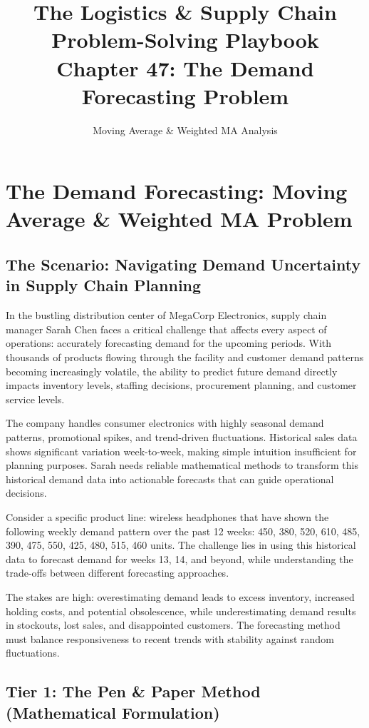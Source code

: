\documentclass{article}
\title{The Logistics \& Supply Chain Problem-Solving Playbook\\Chapter 47: The Demand Forecasting Problem}
\author{Moving Average \& Weighted MA Analysis}
\date{}
\begin{document}
\maketitle

\section{The Demand Forecasting: Moving Average \& Weighted MA Problem}

\subsection{The Scenario: Navigating Demand Uncertainty in Supply Chain Planning}

In the bustling distribution center of MegaCorp Electronics, supply chain manager Sarah Chen faces a critical challenge that affects every aspect of operations: accurately forecasting demand for the upcoming periods. With thousands of products flowing through the facility and customer demand patterns becoming increasingly volatile, the ability to predict future demand directly impacts inventory levels, staffing decisions, procurement planning, and customer service levels.

The company handles consumer electronics with highly seasonal demand patterns, promotional spikes, and trend-driven fluctuations. Historical sales data shows significant variation week-to-week, making simple intuition insufficient for planning purposes. Sarah needs reliable mathematical methods to transform this historical demand data into actionable forecasts that can guide operational decisions.

Consider a specific product line: wireless headphones that have shown the following weekly demand pattern over the past 12 weeks: 450, 380, 520, 610, 485, 390, 475, 550, 425, 480, 515, 460 units. The challenge lies in using this historical data to forecast demand for weeks 13, 14, and beyond, while understanding the trade-offs between different forecasting approaches.

The stakes are high: overestimating demand leads to excess inventory, increased holding costs, and potential obsolescence, while underestimating demand results in stockouts, lost sales, and disappointed customers. The forecasting method must balance responsiveness to recent trends with stability against random fluctuations.

\subsection{Tier 1: The Pen \& Paper Method (Mathematical Formulation)}
\end{document}

